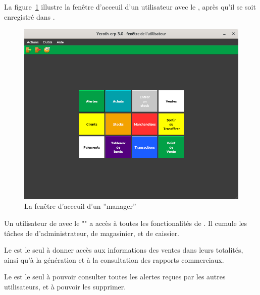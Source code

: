 \label{sec:utilisateurs-vendeur}

La figure~\ref{fig:yeren-fenetre-patron} illustre la fen\^etre
d'acceuil d'un utilisateur avec le \role \manager, 
apr\`es qu'il se soit enregistr\'e dans \yeren.\\

\begin{figure}[!htbp]
\centering
\includegraphics[scale=0.63]{images/yeroth-fenetre-manager.png}
\caption{La fen\^etre d'acceuil d'un ''manager''}
\label{fig:yeren-fenetre-patron}
\end{figure}

Un utilisateur de \yeren avec le \role "\manager" a
acc\`es \`a toutes les fonctionalit\'es de \yeren. Il
cumule les t\^aches de d'administrateur, de magasinier,
et de caissier.

Le \role \manager est le seul \`a donner acc\`es aux
informations des ventes dans leurs totalit\'es, ainsi
qu'\`a la g\'en\'eration et \`a la consultation des
rapports commerciaux.

Le \role \manager est le seul \`a pouvoir consulter toutes
les alertes re\c{c}ues par les autres utilisateurs, et
\`a pouvoir les supprimer.